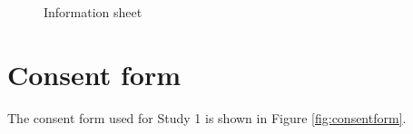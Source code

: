 \begin{figure}[htp] 
\caption{Information sheet}
\label{fig:informationsheet}
\end{figure} 

\chapter{Consent form}\label{ch:consentform}
The consent form used for Study 1 is shown in Figure \ref{fig:consentform}. 


